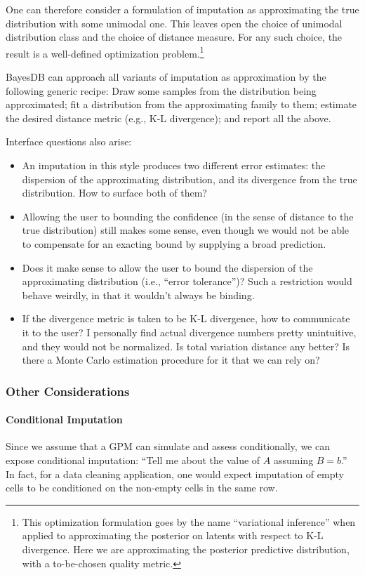 \documentclass[10pt,letterpaper]{article}
\begin{document}
One can therefore consider a formulation of imputation as
approximating the true distribution with some unimodal one.  This
leaves open the choice of unimodal distribution class and the choice
of distance measure.  For any such choice, the result is a
well-defined optimization problem.\footnote{This optimization
  formulation goes by the name ``variational inference'' when applied
  to approximating the posterior on latents with respect to K-L
  divergence.  Here we are approximating the posterior predictive
  distribution, with a to-be-chosen quality metric.}

BayesDB can approach all variants of imputation as approximation by
the following generic recipe: Draw some samples from the distribution
being approximated; fit a distribution from the approximating family
to them; estimate the desired distance metric (e.g., K-L divergence);
and report all the above.

Interface questions also arise:
\begin{itemize}
\item An imputation in this style produces two different error
  estimates: the dispersion of the approximating distribution, and its
  divergence from the true distribution.  How to surface both of them?
\item Allowing the user to bounding the confidence (in the sense of
  distance to the true distribution) still makes some sense, even
  though we would not be able to compensate for an exacting bound by
  supplying a broad prediction.
\item Does it make sense to allow the user to bound the dispersion of
  the approximating distribution (i.e., ``error tolerance'')?  Such a
  restriction would behave weirdly, in that it wouldn't always be
  binding.
\item If the divergence metric is taken to be K-L divergence, how to
  communicate it to the user?  I personally find actual divergence
  numbers pretty unintuitive, and they would not be normalized.  Is
  total variation distance any better?  Is there a Monte Carlo
  estimation procedure for it that we can rely on?
\end{itemize}

\subsubsection{Other Considerations}

\paragraph{Conditional Imputation}
Since we assume that a GPM can simulate and assess conditionally, we
can expose conditional imputation: ``Tell me about the value of $A$
assuming $B=b$.''  In fact, for a data cleaning application, one would
expect imputation of empty cells to be conditioned on the non-empty
cells in the same row.
\end{document}
